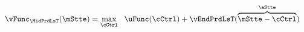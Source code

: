 \begin{equation}\begin{gathered}\begin{aligned}
  \vFunc_{\MidPrdLsT}(\mStte)  & = \max_{\cCtrl} ~~ \uFunc(\cCtrl) +
                              \vEndPrdLsT(\overbrace{\mStte-\cCtrl}^{\aStte})
                              \label{eq:vEndTm1}
\end{aligned}\end{gathered}\end{equation}

